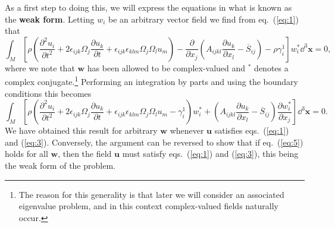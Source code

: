 As a first step to doing this, we will express the equations in what is known as the \textbf{weak form}. 
Letting $w_{i}$ be an arbitrary vector field we find from eq.~(\ref{eq:1}) that
\begin{equation}
\int_{M}\left[\rho\left(\frac{\partial^{2}u_{i}}{\partial t^{2}}+2\epsilon_{ijk}\Omega_{j}\frac{\partial u_{k}}{\partial t}+\epsilon_{ijk}\epsilon_{klm}\Omega_{j}\Omega_{l}u_{m}\right)-\frac{\partial}{\partial x_{j}}\left(A_{ijkl}\frac{\partial u_{k}}{\partial x_{l}}-\overline{S}_{ij}\right)-\rho\gamma_{i}^{1}\right]w_{i}^{*}\dd^{3}\mathbf{x}=0,
\label{eq:4}
\end{equation}
where we note that $\mathbf{w}$ has been allowed to be complex-valued and $^*$ denotes a complex conjugate.\footnote{The reason for this generality is that later we
 will consider an associated eigenvalue problem, and in this context complex-valued fields naturally occur.} Performing an integration by parts and using the 
 boundary conditions this becomes
\begin{equation}
\int_{M}\left[\rho\left(\frac{\partial^{2}u_{i}}{\partial t^{2}}+2\epsilon_{ijk}\Omega_{j}\frac{\partial u_{k}}{\partial t}+\epsilon_{ijk}\epsilon_{klm}\Omega_{j}\Omega_{l}u_{m}-\gamma_{i}^{1}\right)w_{i}^{*}+\left(A_{ijkl}\frac{\partial u_{k}}{\partial x_{l}}-\overline{S}_{ij}\right)\frac{\partial w_{i}^{*}}{\partial x_{j}}\right]\dd^{3}\mathbf{x}=0.
\label{eq:5}
\end{equation}
We have obtained this result for arbitrary $\mathbf{w}$ whenever $\mathbf{u}$ satisfies eqs.~(\ref{eq:1}) and (\ref{eq:3}). Conversely, the argument can be 
reversed to show that if eq.~(\ref{eq:5}) holds for all $\mathbf{w}$, then the field $\mathbf{u}$ must satisfy eqs.~(\ref{eq:1}) and (\ref{eq:3}), 
this being the weak form of the problem.

